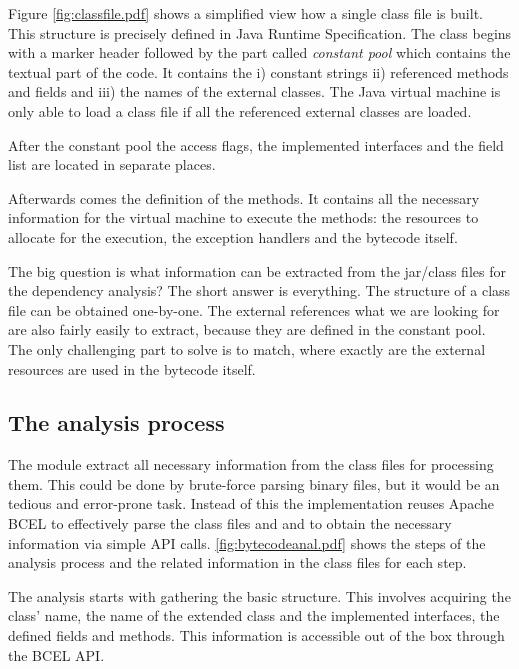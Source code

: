 Figure \autoref{fig:classfile.pdf} shows a simplified view how a single class
file is built. This structure is precisely defined in Java Runtime
Specification. The class begins with a marker header followed by the part called
\textit{constant pool} which contains the textual part of the code. It contains
the i) constant strings ii) referenced methods and fields and iii) the names of
the external classes. The Java virtual machine is only able to load a class file
if all the referenced external classes are loaded.


After the constant pool the access flags, the implemented interfaces and the
field list are located in separate places.

Afterwards comes the definition of the methods. It contains all the necessary
information for the virtual machine to execute the methods: the resources to 
allocate for the execution, the exception handlers and the bytecode itself. 

The big question is what information can be extracted from the jar/class files
for the dependency analysis? The short answer is everything. The structure of a
class file can be obtained one-by-one. The external references what we are
looking for are also fairly easily to extract, because they are defined in the
constant pool. The only challenging part to solve is to match, where exactly are
the external resources are used in the bytecode itself.

\subsection{The analysis process}

The module extract all necessary information from the class files for processing
them. This could be done by brute-force parsing binary files, but it would be an
tedious and error-prone task. Instead of this the implementation reuses Apache
BCEL to effectively parse the class files and and to obtain the necessary
information via simple API calls.
\autoref{fig:bytecodeanal.pdf} shows the steps of the analysis process and the
related information in the class files for each step. 

The analysis starts with gathering the basic structure. This involves acquiring
the class' name, the name of the extended class and the implemented interfaces,
the defined fields and methods. This information is accessible out of the box
through the BCEL API.  

